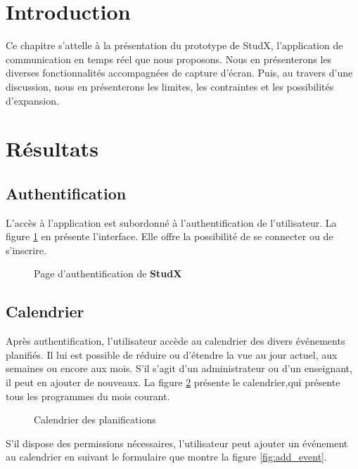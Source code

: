 \section*{Introduction}
Ce chapitre s'attelle à la présentation du prototype de StudX, l’application de communication en temps réel que nous proposons. 
Nous en présenterons les diverses fonctionnalités accompagnées de capture d'écran. 
Puis, au travers d’une discussion, nous en présenterons les limites, les contraintes et les possibilités d’expansion.

\section{Résultats}
\subsection{Authentification}
L'accès à l’application est subordonné à l'authentification de l’utilisateur. 
La figure \ref{fig:proto_auth} en présente l’interface. 
Elle offre la possibilité de se connecter ou de s'inscrire.

\begin{figure}[h]
  \centering
  \caption{Page d'authentification de \textbf{StudX}}
  \label{fig:proto_auth}
\end{figure}

\subsection{Calendrier}
Après authentification, l’utilisateur accède au calendrier des divers événements planifiés. 
Il lui est possible de réduire ou d'étendre la vue au jour actuel, aux semaines ou encore aux mois.  
S’il s’agit d’un administrateur ou d’un enseignant, il peut en ajouter de nouveaux.
La figure \ref{fig:proto_calendar_view} présente le calendrier,qui présente tous les programmes du mois courant.

\begin{figure}[h]
  \centering
  \caption{Calendrier des planifications}
  \label{fig:proto_calendar_view}
\end{figure}

S’il dispose des permissions nécessaires, 
l’utilisateur peut ajouter un événement au calendrier en suivant le formulaire que montre la figure \ref{fig:add_event}.


